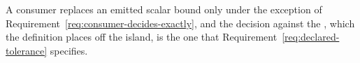 
A consumer replaces an emitted scalar bound only under the exception of
Requirement~\ref{req:consumer-decides-exactly}, and the decision against the
, which the definition places off the island, is the one
that Requirement~\ref{req:declared-tolerance} specifies.

